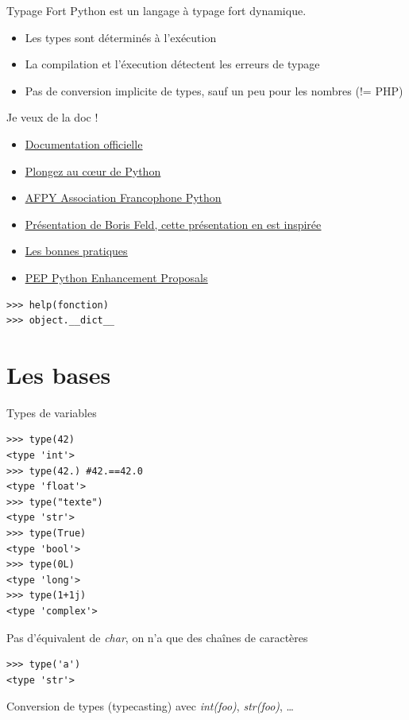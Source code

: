 \documentclass{beamer}
\begin{document}
\begin{frame}{Typage Fort}
Python est un langage à typage fort dynamique.
\begin{itemize}
 \item Les types sont déterminés à l'exécution
 \item La compilation et l'éxecution détectent les erreurs de typage
 \item Pas de conversion implicite de types, sauf un peu pour les nombres (!= PHP)
\end{itemize}
\end{frame}

\begin{frame}[fragile]{Je veux de la doc !}
\begin{itemize}
 \item \underline{\href{http://docs.python.org/}{Documentation officielle}}
 \item \underline{\href{http://diveintopython.adrahon.org/}{Plongez au c\oe{}ur de Python}}
 \item \underline{\href{http://www.afpy.org/}{AFPY Association Francophone Python}}
 \item \underline{\href{http://feldboris.alwaysdata.net/blog/pages/presentations/}{Présentation de Boris Feld, cette présentation en est inspirée}}
 \item \underline{\href{http://www.biologeek.com/bonnes-pratiques,conferences,django,python,traduction/bonnes-pratiques-et-astuces-python/}{Les bonnes pratiques}}
 \item \underline{\href{http://www.python.org/dev/peps/}{PEP Python Enhancement Proposals}}
\end{itemize}

\begin{lstlisting}
>>> help(fonction)
>>> object.__dict__
\end{lstlisting}
\end{frame}

\section{Les bases}
\begin{frame}[fragile]{Types de variables}
\begin{lstlisting}[multicols=2]
>>> type(42)
<type 'int'>
>>> type(42.) #42.==42.0
<type 'float'>
>>> type("texte")
<type 'str'>
>>> type(True)
<type 'bool'>
>>> type(0L)
<type 'long'>
>>> type(1+1j)
<type 'complex'>
\end{lstlisting}

Pas d'équivalent de \textit{char}, on n'a que des chaînes de caractères
\begin{lstlisting}
>>> type('a')
<type 'str'>
\end{lstlisting}

Conversion de types (typecasting) avec \textit{int(foo)}, \textit{str(foo)}, \dots
\end{frame}
\end{document}
